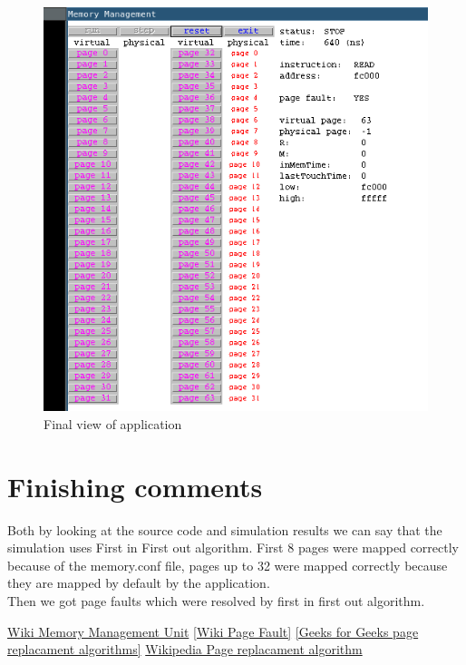 \documentclass{article}
\begin{document}
\begin{figure}[H]
        \caption{Final view of application}                                            
	\includegraphics[width=\linewidth]{mm7}
\end{figure}
\section{Finishing comments}
Both by looking at the source code and simulation results we can say that the
simulation uses First in First out algorithm. First 8 pages were mapped
correctly because of the memory.conf file, pages up to 32 were mapped correctly
because they are mapped by default by the application. \\
Then we got page faults which were resolved by first in first out algorithm. 
\begin{thebibliography}{9}
	 \href{https://en.wikipedia.org/wiki/Memory_management_unit}{Wiki Memory Management Unit}
	 \href{https://en.wikipedia.org/wiki/Page_fault}{[Wiki Page Fault]}
\href{https://www.geeksforgeeks.org/page-replacement-algorithms-in-operating-systems/}{[Geeks
for Geeks page replacament algorithms]}
\href{https://en.wikipedia.org/wiki/Page_replacement_algorithm}{Wikipedia Page
replacament algorithm}
\end{thebibliography}
\end{document}
